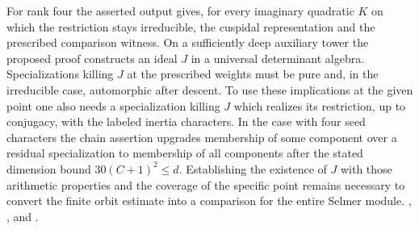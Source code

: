 For rank four the asserted output gives, for every imaginary quadratic
\(K\) on which the restriction stays irreducible, the cuspidal
representation and the prescribed comparison witness. On a sufficiently
deep auxiliary tower the proposed proof constructs an ideal \(J\)
in a universal determinant algebra. Specializations killing \(J\)
at the prescribed weights must be pure and, in the irreducible
case, automorphic after descent. To use these implications at the
given point one also needs a specialization killing \(J\) which
realizes its restriction, up to conjugacy, with the labeled inertia
characters. In the case with four seed characters the chain assertion
upgrades membership of some component over a residual specialization
to membership of all components after the stated dimension bound
\(30(C+1)^2\le d\). Establishing the existence of \(J\) with those
arithmetic properties and the coverage of the specific point remains
necessary to convert the finite orbit estimate into a comparison for
the entire Selmer module.
,
,
and .
